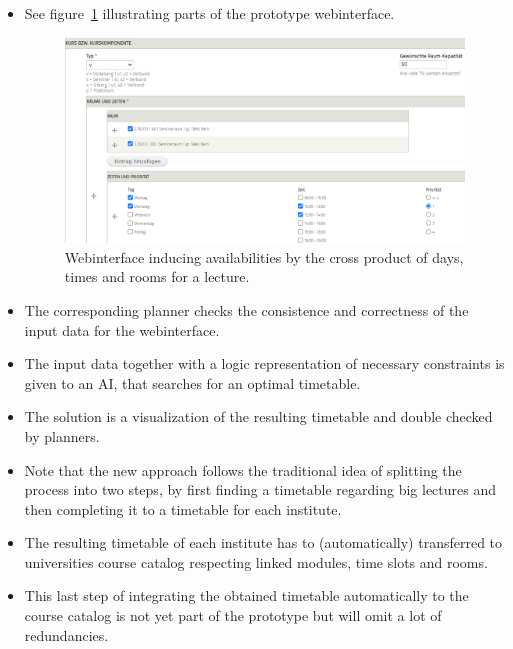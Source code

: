 \documentclass{easychair}
\begin{document}
\begin{itemize}
  \item%
  See figure~\ref{fig:webinterface} illustrating parts of the prototype webinterface. 
  \begin{figure}
    \includegraphics[width=\linewidth]{webinterface}
    \caption{Webinterface inducing availabilities by the cross product of days, times and rooms for a lecture.}
    \label{fig:webinterface}
  \end{figure}
  \item%
  The corresponding planner checks the consistence and correctness of the input data for the webinterface. 
  \item%
  The input data together with a logic representation of necessary constraints is given to an AI, that searches for an optimal timetable. 
  \item%
  The solution is a visualization of the resulting timetable and double checked by planners. 
  \item%
  Note that the new approach follows the traditional idea of splitting the process into two steps, by first finding a timetable regarding big lectures and then completing it to a timetable for each institute. 
  \item%
  The resulting timetable of each institute has to (automatically) transferred to universities course catalog respecting linked modules, time slots and rooms. 
  \item%
  This last step of integrating the obtained timetable automatically to the course catalog is not yet part of the prototype but will omit a lot of redundancies. 
\end{itemize}%


\end{document}
